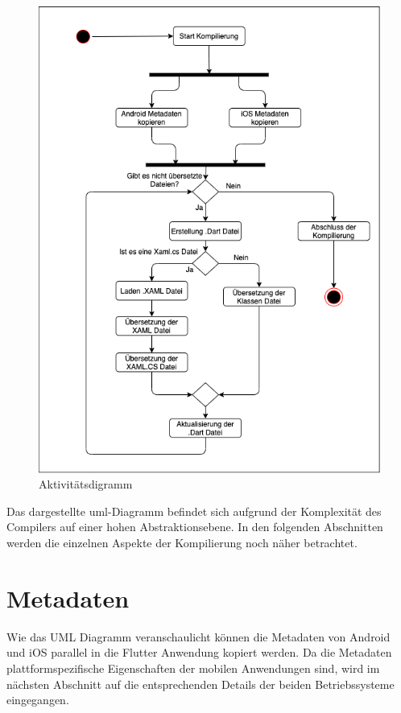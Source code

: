 \newpage
\begin{figure}[!ht]
 \includegraphics[width=\textwidth,keepaspectratio]{Images/Implementation/Ablauf.png}
 \caption{Aktivitätsdigramm}
 \label{fig:umlablauf}
\end{figure}

Das dargestellte \ac{uml}-Diagramm befindet sich aufgrund der Komplexität des Compilers auf einer hohen Abstraktionsebene. In den folgenden Abschnitten werden die einzelnen Aspekte der Kompilierung noch näher betrachtet.


\section{Metadaten}
Wie das UML Diagramm veranschaulicht können die Metadaten von Android und iOS parallel in die Flutter Anwendung kopiert werden.  Da die Metadaten
plattformspezifische Eigenschaften der mobilen Anwendungen sind, wird im nächsten Abschnitt auf die entsprechenden Details der beiden Betriebssysteme eingegangen.


